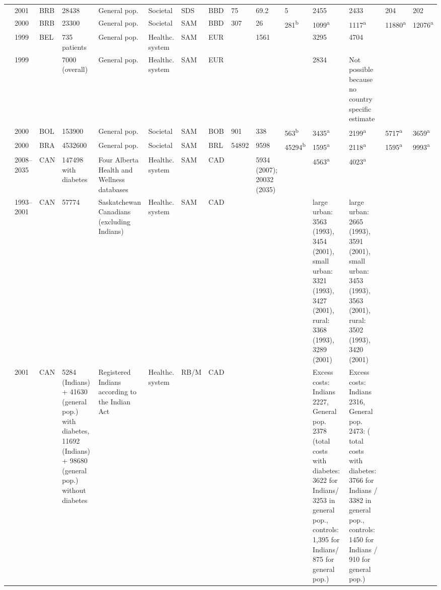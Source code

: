 {\begin{landscape}
\begin{tabularx}{\linewidth}{Z X X Z Z X X X X X X X X Y Y}
\textcite{Abdulkadri2009b} & 2001 & BRB & 28438 & General pop. & Societal & SDS & BBD & 75 & 69.2 & 5 & 2455 & 2433 & 204 & 202 \\
\textcite{Barcelo2003} & 2000 & BRB & 23300 & General pop. & Societal & SAM & BBD & 307 & 26 & 281\textsuperscript{b} & 1099\textsuperscript{a} & 1117\textsuperscript{a} & 11880\textsuperscript{a} & 12076\textsuperscript{a} \\
\textcite{Jonsson2002b} & 1999 & BEL & 735 patients & General pop. & Healthc. system & SAM & EUR &  & 1561 &  & 3295 & 4704 &  &  \\
\textcite{Jonsson2002b} & 1999 &  & 7000 (overall) & General pop. & Healthc. system & SAM & EUR &  &  &  & 2834 &Not possible because no country specific   estimate &  &  \\
\textcite{Barcelo2003} & 2000 & BOL & 153900 & General pop. & Societal & SAM & BOB & 901 & 338 & 563\textsuperscript{b} & 3435\textsuperscript{a} & 2199\textsuperscript{a} & 5717\textsuperscript{a} & 3659\textsuperscript{a} \\
\textcite{Barcelo2003} & 2000 & BRA & 4532600 & General pop. & Societal & SAM & BRL & 54892 & 9598 & 45294\textsuperscript{b} & 1595\textsuperscript{a} & 2118\textsuperscript{a} & 1595\textsuperscript{a} & 9993\textsuperscript{a} \\
\textcite{Lau2011a} & 2008--2035 & CAN & 147498 with diabetes & Four Alberta Health and Wellness databases & Healthc. system & SAM & CAD &  & 5934 (2007); 20032 (2035) &  & 4563\textsuperscript{a} & 4023\textsuperscript{a} &  &  \\
\textcite{Pohar2007} & 1993--2001 & CAN & 57774 & Saskatchewan Canadians (excluding Indians) & Healthc. system & SAM & CAD &  &  &  & large urban: 3563 (1993), 3454 (2001), small  urban: 3321 (1993), 3427 (2001), rural: 3368 (1993), 3289 (2001) & large urban: 2665 (1993), 3591 (2001),   small urban: 3453 (1993), 3563 (2001), rural: 3502 (1993), 3420 (2001) &  &  \\
\textcite{Pohar2007a} & 2001 & CAN & 5284 (Indians) + 41630 (general pop.) with  diabetes, 11692 (Indians) + 98680 (general pop.) without diabetes & Registered Indians according to the Indian   Act & Healthc. system & RB/M & CAD &  &  &  & Excess costs: Indians 2227, General pop.   2378 (total costs with diabetes: 3622 for Indians/ 3253 in general pop.,   controls: 1,395 for Indians/ 875 for general pop.) & Excess costs: Indians 2316, General pop.   2473: ( total costs with diabetes: 3766 for Indians / 3382 in general pop.,   controls: 1450 for Indians / 910 for general pop.) &  &  \\

\end{tabularx}
\end{landscape}}
